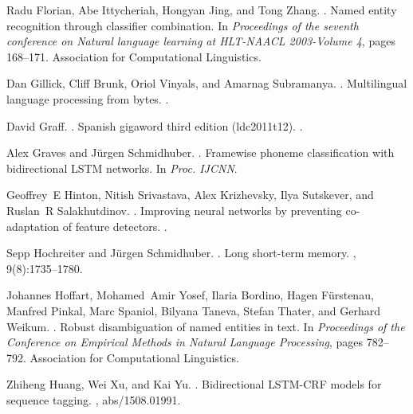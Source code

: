 \documentclass[11pt,letterpaper]{article}
\begin{document}
\begin{thebibliography}{}
Radu Florian, Abe Ittycheriah, Hongyan Jing, and Tong Zhang.
.
\newblock Named entity recognition through classifier combination.
\newblock In {\em Proceedings of the seventh conference on Natural language
  learning at HLT-NAACL 2003-Volume 4}, pages 168--171. Association for
  Computational Linguistics.

Dan Gillick, Cliff Brunk, Oriol Vinyals, and Amarnag Subramanya.
.
\newblock Multilingual language processing from bytes.
.

David Graff.
.
\newblock Spanish gigaword third edition (ldc2011t12).
.

Alex Graves and J\"{u}rgen Schmidhuber.
.
\newblock Framewise phoneme classification with bidirectional {LSTM} networks.
\newblock In {\em Proc. IJCNN}.

Geoffrey~E Hinton, Nitish Srivastava, Alex Krizhevsky, Ilya Sutskever, and
  Ruslan~R Salakhutdinov.
.
\newblock Improving neural networks by preventing co-adaptation of feature
  detectors.
.

Sepp Hochreiter and J\"urgen Schmidhuber.
.
\newblock Long short-term memory.
, 9(8):1735--1780.

Johannes Hoffart, Mohamed~Amir Yosef, Ilaria Bordino, Hagen F{\"u}rstenau,
  Manfred Pinkal, Marc Spaniol, Bilyana Taneva, Stefan Thater, and Gerhard
  Weikum.
.
\newblock Robust disambiguation of named entities in text.
\newblock In {\em Proceedings of the Conference on Empirical Methods in Natural
  Language Processing}, pages 782--792. Association for Computational
  Linguistics.

Zhiheng Huang, Wei Xu, and Kai Yu.
.
\newblock Bidirectional {LSTM-CRF} models for sequence tagging.
, abs/1508.01991.


\end{thebibliography}
\end{document}

